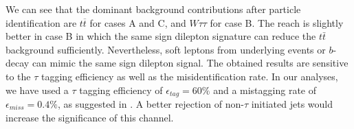 We can see that the dominant background contributions after particle identification are $t\overline{t}$ for cases A and C, and $W\tau\tau$   for case B.  The reach is slightly better in case B in which the same sign dilepton signature can reduce the $t\bar{t}$ background sufficiently.  Nevertheless, soft leptons from underlying events or $b$-decay can mimic the same sign dilepton signal.  The obtained   results are sensitive to the $\tau$ tagging efficiency as well as the misidentification rate.  In our analyses, we have used a  $\tau$ tagging efficiency of $\epsilon_{tag}=60\%$ and a mistagging rate of $\epsilon_{miss}=0.4\%$,  as suggested in \cite{snowmassdetector}.  A better rejection of non-$\tau$ initiated jets would increase the significance of this channel. 
